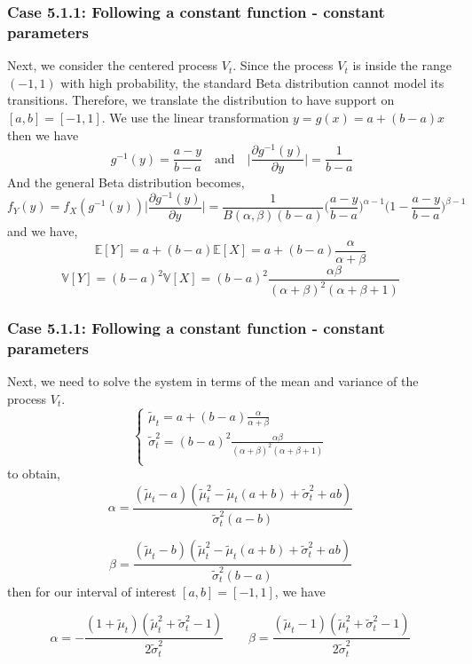 \documentclass[aspectratio=169]{beamer}\usepackage[utf8]{inputenc}
\newcommand{\E}{\mathbb{E}}
\newcommand{\V}{\mathbb{V}}
\begin{document}
\begin{frame}\frametitle{ Case 5.1.1: Following a constant function - constant parameters }
Next, we consider the centered process $V_t$. Since the process $V_t$ is  inside the range $(-1,1)$ with high probability, the standard Beta distribution cannot model its transitions. Therefore, we translate the distribution to have support on $[a,b]=[-1,1]$.  We use the linear transformation $y= g(x)= a + (b-a) x $ then we have
\begin{equation}
\  g^{-1}(y)= \frac{a-y}{b-a} \quad \text{and} \quad \Big| \frac{\partial g^{-1}(y)}{\partial y }  \Big| = \frac{1}{b-a}
\end{equation}
And the general Beta distribution becomes, 
\begin{equation}
f_Y(y)= f_X(g^{-1}(y) ) \Big| \frac{\partial g^{-1}(y)}{\partial y }  \Big| = \frac{1}{B(\alpha, \beta) (b-a)} \Big(\frac{a-y}{b-a}\Big)^{\alpha -1}\Big(1-\frac{a-y}{b-a} \Big)^{\beta -1}
\end{equation}
and we have,
\begin{equation}
\E[Y]= a + (b-a) \E[X] = a + (b-a) \frac{\alpha}{\alpha + \beta}
\end{equation}
\begin{equation}
\V[Y]= (b-a)^2 \V[X] = (b-a)^2 \frac{\alpha \beta}{(\alpha + \beta)^2 (\alpha + \beta + 1)}
\end{equation}
\end{frame}

\begin{frame}\frametitle{ Case 5.1.1: Following a constant function - constant parameters }
Next, we need to solve the system in terms of the mean and variance of the process $V_t$.
\begin{equation}
\begin{cases}
\tilde{\mu}_t=a + (b-a) \frac{\alpha}{\alpha + \beta}\\
\tilde{\sigma}_t^2= (b-a)^2 \frac{\alpha \beta}{(\alpha + \beta)^2 (\alpha + \beta + 1)}\\
\end{cases}
\end{equation}
to obtain, 
\begin{equation}
\alpha = \frac{(\tilde{\mu}_t-a) \left(\tilde{\mu}_t^2-\tilde{\mu}_t (a+b)+\tilde{\sigma}_t^2+a b\right)}{\tilde{\sigma}_t^2 (a-b)}
\end{equation}

\begin{equation}
\beta = \frac{(\tilde{\mu}_t-b) \left(\tilde{\mu}_t^2-\tilde{\mu}_t (a+b)+\tilde{\sigma}_t^2+a b\right)}{\tilde{\sigma}_t^2 (b-a)}
\end{equation}
then for our interval of interest $[a,b]=[-1,1]$, we have

\begin{equation}
\alpha = - \frac{(1+\tilde{\mu}_t )(\tilde{\mu}_t^2 + \tilde{\sigma}_t^2 -1)}{2 \tilde{\sigma}_t^2} \quad \quad \beta =  \frac{(\tilde{\mu}_t-1 )(\tilde{\mu}_t^2 + \tilde{\sigma}_t^2 -1)}{2 \tilde{\sigma}_t^2} \label{param_transformed_beta}
\end{equation}

\end{frame}
\end{document}

